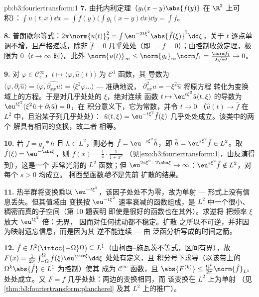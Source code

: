 \begin{solution}{pb:b3:fouriertransform:1}
\textbf{7.} 由托内利定理（$g_t(x-y)\abs{f(y)}$ 在
$\R^2$ 上可积）：$\int u(t,x)\dd x = \int f(y)\bigl(\int g_t(x -
y)\dd x\bigr)\dd y = \int f$。

\textbf{8.} 普朗歇尔等式：$2\pi\norm{u(t)}_2^2 =
\int\eu^{-2t\xi^2}\abs{\hat f(\xi)}^2\dd\xi$，关于
$t$ 逐点单调不增，且严格递减，除非 $\hat f = 0$ 几乎处处（即 $= f =
0$）；由控制收敛定理，极限为 $0$（$t\to\infty$ 时）。此外
$\norm{u(t)}_\infty \leq \norm{g_t}_\infty\norm f_1 =
\frac{\norm f_1}{2\sqrt{\pi t}} \to 0$。

\textbf{9.} 对 $\varphi \in \mathcal C_c^\infty$，$t \mapsto
\langle\varphi, \hat u(t)\rangle$ 为 $\mathcal C^1$ 函数，其
导数为 $\langle\varphi, \partial_t\hat u\rangle =
\langle\varphi, \widehat{\partial_{xx}u}\rangle =
\langle\xi^2\varphi\dots\rangle$ --- 准确地说，
$\widehat{\partial^2_{xx}u} = -\xi^2\hat u$ 将原方程
转化为变换域上的方程。于是对几乎处处的 $\xi$，绝对连续
函数 $t \mapsto \eu^{t\xi^2}\hat u(t,\xi)$ 的导数为
$\eu^{t\xi^2}(\xi^2\hat u + \partial_t\hat u) = 0$，在
积分意义下，它为常数，并令 $t \to 0$
（$\hat u(t) \to \hat f$ 在 $L^2$ 中，且沿某子列几乎处处）：
$\hat u(t, \xi) = \eu^{-t\xi^2}\hat f(\xi)$ 几乎处处成立。该类中的两个
解具有相同的变换，故二者
相等。

\textbf{10.} 若 $f = g_s * h$ 且 $h \in L^2$，则必有 $\hat f =
\eu^{-s\xi^2}\hat h$，即 $\hat h = \eu^{s\xi^2}\hat f \in
L^2$。取 $\hat f(\xi) = \eu^{-\abs\xi}$，则 $f(x) =
\frac1\pi\cdot\frac1{1 + x^2}$
（见\cref{exo:b3:fouriertransform:1}，由反演得到），这是一个
非常光滑的 $L^2$ 函数；但 $\eu^{2s\xi^2 - 2\abs\xi} \to
\infty$：$\eu^{s\xi^2}\hat f \notin L^2$，对每个 $s > 0$ 均成立。
柯西型函数\emph{绝不}是先前
扩散的结果。

\textbf{11.} 热半群将变换乘以
$\eu^{-t\xi^2}$，该因子处处不为零，故为单射 ---
形式上没有信息丢失。但其值域由
变换按 $\eu^{-t\xi^2}$ 速率衰减的函数组成，是
$L^2$ 中一个很小、稠密而真的子空间（第 10 题表明
即使是很好的函数也在其外）。求逆将
把频率 $\xi$ 放大 $\eu^{t\xi^2}$ 倍：无界，
因而对任何扰动都不稳定。扩散
之所以不可逆，并非因为映射遗忘信息，而是因为其
逆不能连续 --- 由
泛函分析写成的时间之箭。

\textbf{12.} $\hat f \in L^2(\intcc{-\Omega}\Omega)
\subseteq L^1$（由柯西--施瓦茨不等式，区间有界），故
$F(x) = \frac1{2\pi}\int_{-\Omega}^\Omega\hat
f(\xi)\eu^{\iu x\xi}\dd\xi$ 处处有定义，且
积分号下求导（以该带上的
$\Omega^k\abs{\hat f} \in L^1$ 为控制）使其
成为 $\mathcal C^\infty$ 函数，且 $\abs{F^{(k)}} \leq
\frac{\Omega^k}{2\pi}\norm{\hat f}_{L^1}$ 处处成立。又 $F
= f$ 几乎处处：两边的变换相同，而
该变换在 $L^2$ 上为单射
（见\cref{thm:b3:fouriertransform:plancherel} 及其
$L^2$ 上的推广）。


\end{solution}
